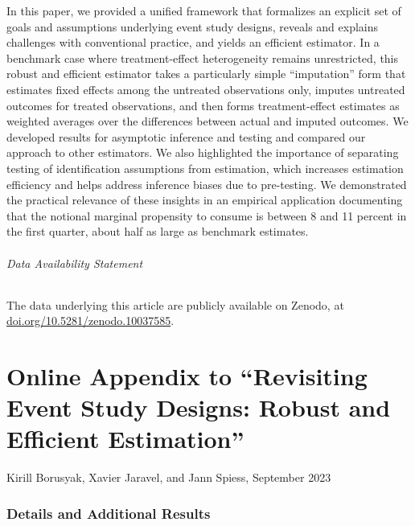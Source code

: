 \documentclass[english,11pt]{article}
\theoremstyle{plain}
\theoremstyle{plain}
\theoremstyle{plain}
\theoremstyle{plain}
\begin{document}
In this paper, we provided a unified framework that formalizes an
explicit set of goals and assumptions underlying event study designs,
reveals and explains challenges with conventional practice, and yields
an efficient estimator. In a benchmark case where treatment-effect
heterogeneity remains unrestricted, this robust and efficient estimator
takes a particularly simple ``imputation'' form that estimates fixed
effects among the untreated observations only, imputes untreated outcomes
for treated observations, and then forms treatment-effect estimates
as weighted averages over the differences between actual and imputed
outcomes. We developed results for asymptotic inference and testing
and compared our approach to other estimators. We also highlighted
the importance of separating testing of identification assumptions
from estimation, which increases estimation efficiency and helps address
inference biases due to pre-testing. We demonstrated the practical
relevance of these insights in an empirical application documenting
that the notional marginal propensity to consume is between 8 and
11 percent in the first quarter, about half as large as benchmark
estimates.

\paragraph{Data Availability Statement}

The data underlying this article are publicly available on Zenodo, at \href{https://doi.org/10.5281/zenodo.10037585}{doi.org/10.5281/zenodo.10037585}.

\printbibliography


\appendix
\newpage{} \renewcommand{\theprop}{A\arabic{prop}}\renewcommand{\thecor}{A\arabic{cor}}\renewcommand*{\thepage}{A\arabic{page}} \newrefsection

\part*{Online Appendix to \textquotedblleft Revisiting Event Study Designs:
Robust and Efficient Estimation\textquotedblright}

Kirill Borusyak, Xavier Jaravel, and Jann Spiess, September 2023

\section{Details and Additional Results\label{sec:appx}}
\end{document}
